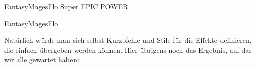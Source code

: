 \begin{bemerkung}
\begin{latex}[firstnumber=last,morekeywords={[5]{\\FantasyxCreateCardClass}}]
\begin{NewFantasyCard}{Fantasy}{Mages}{Flo}
{        {\scriptsize Super EPIC POWER}
    }
\end{NewFantasyCard}
    \end{latex}
    \begin{NewFantasyCard}{Fantasy}{Mages}{Flo}
    \end{NewFantasyCard}
    Natürlich würde man sich selbst Kurzbfehle und Stile für die Effekte definieren, die einfach übergeben werden können. Hier übrigens noch das Ergebnis, auf das wir alle gewartet haben: \iflillycompact\else\begin{center}
        \Flo
    \end{center}\fi
\end{bemerkung}